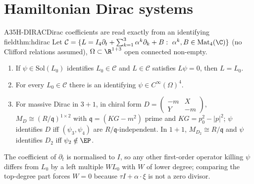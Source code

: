 
\section{Hamiltonian Dirac systems}

\begin{dimcard}{A35}{H-DIRAC}{Dirac coefficients are read exactly from an identifying field}{\proved}{thm:hdirac}
Let $\mathcal C=\{L=I_4\partial_t+\sum_{k=1}^3\alpha^k\partial_k+B:\ \alpha^k,B\in\mathrm{Mat}_4(\C)\}$ (no Clifford relations assumed), $\Omega\subset\R^{1+3}$ open connected non-empty.
\begin{enumerate}[label=(\alph*)]
\item If $\psi\in\mathrm{Sol}(L_0)$ identifies $L_0\in\mathcal C$ and $L\in\mathcal C$ satisfies $L\psi=0$, then $L=L_0$.
\item For every $L_0\in\mathcal C$ there is an identifying $\psi\in C^\infty(\Omega)^4$.
\item For massive Dirac in $3+1$, in chiral form $D=\begin{pmatrix}-m&X\\Y&-m\end{pmatrix}$, $M_D\cong(R/\mathfrak q)^{1\times2}$ with $\mathfrak q=(KG-m^2)$ prime and $KG=p_0^2-|p|^2$; $\psi$ identifies $D$ iff $(\psi_3,\psi_4)$ are $R/\mathfrak q$-independent. In $1+1$, $M_{D_2}\cong R/\mathfrak q$ and $\psi$ identifies $D_2$ iff $\psi_2\notin\EP$.
\end{enumerate}
\end{dimcard}

\begin{proofidea}
The coefficient of $\partial_t$ is normalised to $I$, so any other first-order operator killing $\psi$ differs from $L_0$ by a left multiple $WL_0$ with $W$ of lower degree; comparing the top-degree part forces $W=0$ because $\tau I+\alpha\cdot\xi$ is not a zero divisor.
\end{proofidea}

